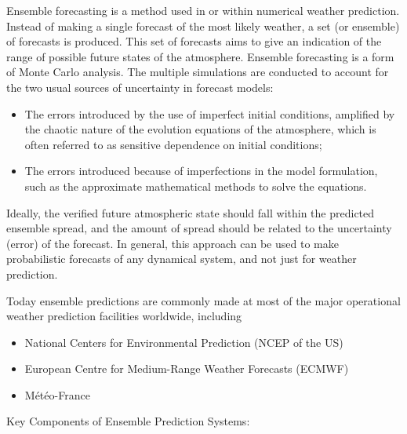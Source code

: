 \documentclass[../paper.tex]{subfiles}
\begin{document}
Ensemble forecasting is a method used in or within numerical weather prediction.
Instead of making a single forecast of the most likely weather, a set (or ensemble) of forecasts is produced.
This set of forecasts aims to give an indication of the range of possible future states of the atmosphere.
Ensemble forecasting is a form of Monte Carlo analysis.
The multiple simulations are conducted to account for the two usual sources of uncertainty in forecast models:
\begin{itemize}
    \item The errors introduced by the use of imperfect initial conditions, amplified by the chaotic nature of the evolution equations of the atmosphere, which is often referred to as sensitive dependence on initial conditions;
    \item The errors introduced because of imperfections in the model formulation, such as the approximate mathematical methods to solve the equations.
\end{itemize}
Ideally, the verified future atmospheric state should fall within the predicted ensemble spread,
and the amount of spread should be related to the uncertainty (error) of the forecast.
In general, this approach can be used to make probabilistic forecasts of any dynamical system,
and not just for weather prediction.\cite{a1}

Today ensemble predictions are commonly made at most of the major operational weather prediction facilities worldwide,
including
\begin{itemize}
    \item National Centers for Environmental Prediction (NCEP of the US)
    \item European Centre for Medium-Range Weather Forecasts (ECMWF)
    \item Météo-France
\end{itemize}\cite{a1}

Key Components of Ensemble Prediction Systems:
\end{document}
